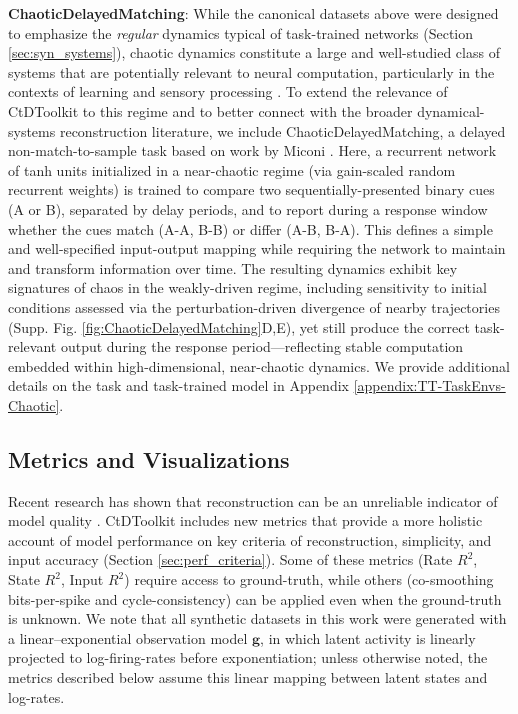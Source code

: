 \documentclass{article}
\begin{document}
\textbf{ChaoticDelayedMatching}: While the canonical datasets above were designed to emphasize the \textit{regular} dynamics typical of task-trained networks (Section \ref{sec:syn_systems}), chaotic dynamics constitute a large and well-studied class of systems that are potentially relevant to neural computation, particularly in the contexts of learning and sensory processing \cite{laje2013robust, sussillo2009generating}. To extend the relevance of CtDToolkit to this regime and to better connect with the broader dynamical-systems reconstruction literature, we include ChaoticDelayedMatching, a delayed non-match-to-sample task based on work by Miconi \cite{miconi2017biologically}. Here, a recurrent network of tanh units initialized in a near-chaotic regime (via gain-scaled random recurrent weights) is trained to compare two sequentially-presented binary cues (A or B), separated by delay periods, and to report during a response window whether the cues match (A-A, B-B) or differ (A-B, B-A). This defines a simple and well-specified input-output mapping while requiring the network to maintain and transform information over time. The resulting dynamics exhibit key signatures of chaos in the weakly-driven regime, including sensitivity to initial conditions assessed via the perturbation-driven divergence of nearby trajectories (Supp. Fig. \ref{fig:ChaoticDelayedMatching}D,E), yet still produce the correct task-relevant output during the response period—reflecting stable computation embedded within high-dimensional, near-chaotic dynamics. We provide additional details on the task and task-trained model in Appendix \ref{appendix:TT-TaskEnvs-Chaotic}.

\vspace{-0.2cm}
\subsection{Metrics and Visualizations \label{MetricsViz}}
\vspace{-0.2cm}

Recent research has shown that reconstruction can be an unreliable indicator of model quality \cite{Genkin2020-ow, sedler_expressive_2022}. CtDToolkit includes new metrics that provide a more holistic account of model performance on key criteria of reconstruction, simplicity, and input accuracy (Section \ref{sec:perf_criteria}). Some of these metrics (Rate $R^2$, State $R^2$, Input $R^2$) require access to ground-truth, while others (co-smoothing bits-per-spike and cycle-consistency) can be applied even when the ground-truth is unknown. We note that all synthetic datasets in this work were generated with a linear--exponential observation model $\mathbf{g}$, in which latent activity is linearly projected to log-firing-rates before exponentiation; unless otherwise noted, the metrics described below assume this linear mapping between latent states and log-rates.
\end{document}
